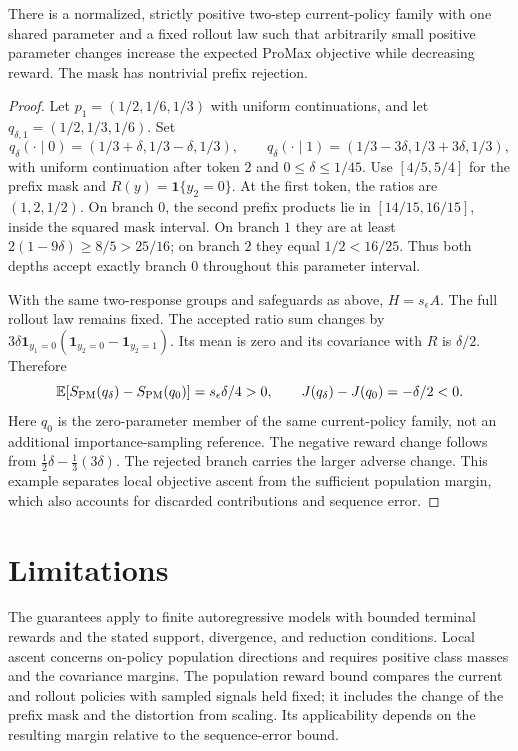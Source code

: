 \begin{proposition}
\label{prop:coupled-gate-failure}
There is a normalized, strictly positive two-step current-policy family
with one shared parameter and a fixed rollout law such that arbitrarily
small positive parameter changes increase the expected ProMax objective
while decreasing reward. The mask has nontrivial prefix rejection.
\end{proposition}
\begin{proof}
Let $p_1=(1/2,1/6,1/3)$ with uniform continuations, and let
$q_{\delta,1}=(1/2,1/3,1/6)$. Set
\[
 q_\delta(\cdot\mid0)=(1/3+\delta,1/3-\delta,1/3),\qquad
 q_\delta(\cdot\mid1)=(1/3-3\delta,1/3+3\delta,1/3),
\]
with uniform continuation after token $2$ and $0\le\delta\le1/45$.
Use $[4/5,5/4]$ for the prefix mask and $R(y)=\mathbf1\{y_2=0\}$.
At the first token, the ratios are $(1,2,1/2)$. On branch $0$, the
second prefix products lie in $[14/15,16/15]$, inside the squared mask
interval. On branch $1$ they are at least $2(1-9\delta)\ge8/5>25/16$;
on branch $2$ they equal $1/2<16/25$. Thus both depths accept exactly
branch $0$ throughout this parameter interval.

With the same two-response groups and safeguards as above, $H=s_\epsilon A$.
The full rollout law remains fixed. The accepted ratio sum changes by
$3\delta\mathbf1_{y_1=0}(\mathbf1_{y_2=0}-\mathbf1_{y_2=1})$.
Its mean is zero and its covariance with $R$ is $\delta/2$. Therefore
\begin{equation}
 \mathbb{E}[S_{\rm PM}(q_\delta)-S_{\rm PM}(q_0)]
 =s_\epsilon\delta/4>0,\qquad
 J(q_\delta)-J(q_0)=-\delta/2<0.
 \label{eq:coupled-gate-failure}
\end{equation}
Here $q_0$ is the zero-parameter member of the same current-policy family,
not an additional importance-sampling reference. The negative reward
change follows from $\tfrac12\delta-\tfrac13(3\delta)$.
The rejected branch carries the larger adverse change. This example
separates local objective ascent from the sufficient population margin,
which also accounts for discarded contributions and sequence error.
\end{proof}

\section{Limitations}
The guarantees apply to finite autoregressive models with bounded terminal
rewards and the stated support, divergence, and reduction conditions.
Local ascent concerns on-policy population directions and requires positive
class masses and the covariance margins. The population reward bound
compares the current and rollout policies with sampled signals held fixed;
it includes the change of the prefix mask and the distortion from scaling. Its
applicability depends on the resulting margin relative to the sequence-error bound.

